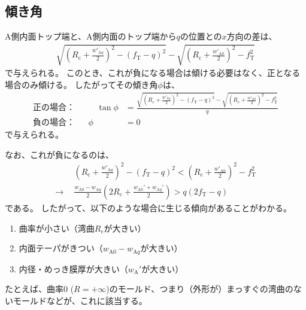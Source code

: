 \subsection{傾き角}
A側内面トップ端と、A側内面のトップ端から$q$の位置との$x$方向の差は、
\begin{align*}
  \sqrt{\left(R_\mathrm c+\frac{w'_{\mathrm Aq}}2\right)^{\!\!2}-(f_\mathrm T-q)^2}
  -\sqrt{\left(R_\mathrm c+\frac{w'_{\mathrm A0}}2\right)^{\!\!2}-f_\mathrm T^2}
\end{align*}
で与えられる。
このとき、これが負になる場合は傾ける必要はなく、正となる場合のみ傾ける。
したがってその傾き角$\phi$は、
\begin{subequations}
\label{eq:dKatamuki}
\begin{alignat}{2}
  \text{正の場合：}&&\quad
  \tan\phi
  &= \frac{\displaystyle
           \sqrt{\left(R_\mathrm c+\frac{w'_{\mathrm Aq}}2\right)^{\!\!2}-(f_\mathrm T-q)^2}
           -\sqrt{\left(R_\mathrm c+\frac{w'_{\mathrm A0}}2\right)^{\!\!2}-f_\mathrm T^2}}q\\[8pt]
  \text{負の場合：}&&
  \phi
  &= 0
\end{alignat}
\end{subequations}
で与えられる。
\begin{hosoku}
なお、これが負になるのは、
\begin{align*}
  & \left(R_\mathrm c+\frac{w'_{\mathrm Aq}}2\right)^{\!\!2}-(f_\mathrm T-q)^2
    < \left(R_\mathrm c+\frac{w'_{\mathrm A0}}2\right)^{\!\!2}-f_\mathrm T^2\\
  \longrightarrow~~
  & \frac{w_{\mathrm A0}-w_{\mathrm Aq}}2
    \left(2R_\mathrm c+\frac{w_{\mathrm A0}'+w_{\mathrm Aq}'}2\right)
    > q(2f_\mathrm T-q)
\end{align*}
である。
したがって、以下のような場合に生じる傾向があることがわかる。
\begin{enumerate}
\item {}曲率が小さい（湾曲$R_\mathrm c$が大きい）
\item {}内面テーパがきつい（$w_{\mathrm A0}-w_{\mathrm Aq}$が大きい）
\item {}内径・めっき膜厚が大きい（$w_\mathrm A'$が大きい）
\end{enumerate}
たとえば、曲率0 ($R = +\infty$)のモールド、つまり（外形が）まっすぐの湾曲のないモールドなどが、これに該当する。
\end{hosoku}
